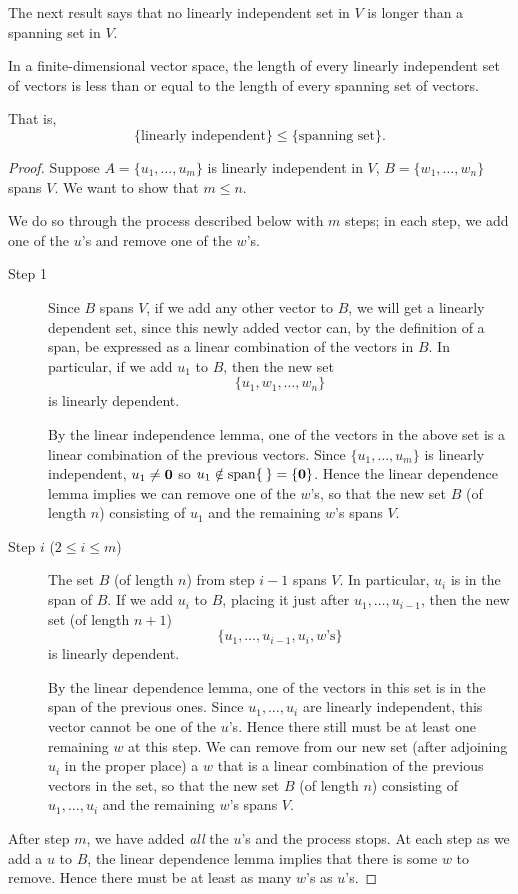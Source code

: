 The next result says that no linearly independent set in $V$ is longer than a spanning set in $V$.

\begin{proposition}\label{prop:length-linind-span}
In a finite-dimensional vector space, the length of every linearly independent set of vectors is less than or equal to the length of every spanning set of vectors.
\end{proposition}

That is,
\begin{equation}
\{\text{linearly independent}\}\le\{\text{spanning set}\}.
\end{equation}

\begin{proof}
Suppose $A=\{u_1,\dots,u_m\}$ is linearly independent in $V$, $B=\{w_1,\dots,w_n\}$ spans $V$. We want to show that $m\le n$.

We do so through the process described below with $m$ steps; in each step, we add one of the $u$'s and remove one of the $w$'s.

\begin{description}
\item[Step 1] Since $B$ spans $V$, if we add any other vector to $B$, we will get a linearly dependent set, since this newly added vector can, by the definition of a span, be expressed as a linear combination of the vectors in $B$. In particular, if we add $u_1$ to $B$, then the new set
\[\{u_1,w_1,\dots,w_n\}\]
is linearly dependent.

By the linear independence lemma, one of the vectors in the above set is a linear combination of the previous vectors. 
Since $\{u_1,\dots,u_m\}$ is linearly independent, $u_1\neq\vb{0}$ so $u_1\notin\operatorname{span}\{\:\}=\{\vb{0}\}$.
Hence the linear dependence lemma implies we can remove one of the $w$'s, so that the new set $B$ (of length $n$) consisting of $u_1$ and the remaining $w$'s spans $V$.

\item[Step $i$ ($2\le i\le m$)] 
The set $B$ (of length $n$) from step $i-1$ spans $V$. In particular, $u_i$ is in the span of $B$. If we add $u_i$ to $B$, placing it just after $u_1,\dots,u_{i-1}$, then the new set (of length $n+1$)
\[\{u_1,\dots,u_{i-1},u_i,w\text{'s}\}\]
is linearly dependent. 

By the linear dependence lemma, one of the vectors in this set is in the span of the previous ones. Since $u_1,\dots,u_i$ are linearly independent, this vector cannot be one of the $u$'s.
Hence there still must be at least one remaining $w$ at this step. We can remove from our new set (after adjoining $u_i$ in the proper place) a $w$ that is a linear combination of the previous vectors in the set, so that the new set $B$ (of length $n$) consisting of $u_1,\dots,u_i$ and the remaining $w$'s spans $V$.
\end{description}

After step $m$, we have added \emph{all} the $u$'s and the process stops. At each step as we add a $u$ to $B$, the linear dependence lemma implies that there is some $w$ to remove. 
Hence there must be at least as many $w$'s as $u$'s.
\end{proof}

